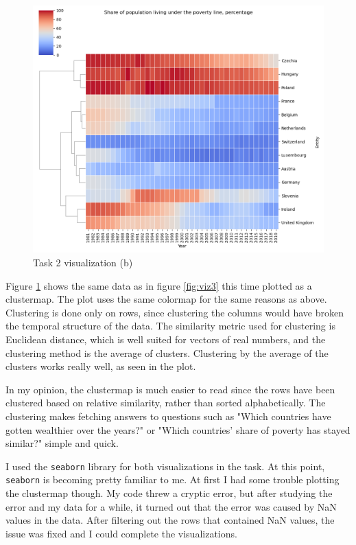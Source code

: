\documentclass[11pt,a4paper,titlepage]{article}
\begin{document}
\newpage

\begin{figure}[h!]
    \centering
    \includegraphics[width=1.0\linewidth]{reports/assignment-3/imgs/task2-2.png}
    \caption{Task 2 visualization (b)}
    \label{fig:viz4}
\end{figure}

Figure \ref{fig:viz4} shows the same data as in figure \ref{fig:viz3} this time plotted as a clustermap. The plot uses the same colormap for the same reasons as above. Clustering is done only on rows, since clustering the columns would have broken the temporal structure of the data. The similarity metric used for clustering is Euclidean distance, which is well suited for vectors of real numbers, and the clustering method is the average of clusters. Clustering by the average of the clusters works really well, as seen in the plot.

In my opinion, the clustermap is much easier to read since the rows have been clustered based on relative similarity, rather than sorted alphabetically. The clustering makes fetching answers to questions such as "Which countries have gotten wealthier over the years?" or "Which countries' share of poverty has stayed similar?" simple and quick.

I used the \texttt{seaborn} library for both visualizations in the task. At this point, \texttt{seaborn} is becoming pretty familiar to me. At first I had some trouble plotting the clustermap though. My code threw a cryptic error, but after studying the error and my data for a while, it turned out that the error was caused by NaN values in the data. After filtering out the rows that contained NaN values, the issue was fixed and I could complete the visualizations.

\newpage


\end{document}
